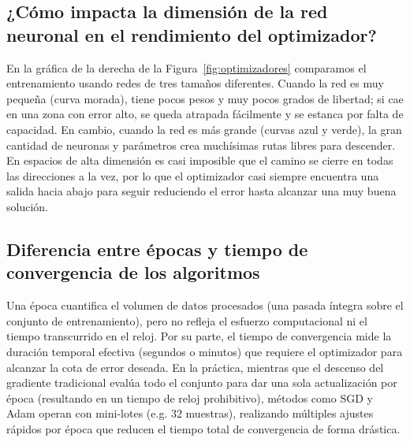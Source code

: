 \documentclass[10pt,a4paper]{article}
\begin{document}
\subsection*{¿Cómo impacta la dimensión de la red neuronal en el rendimiento del optimizador?}

En la gráfica de la derecha de la Figura~\ref{fig:optimizadores} comparamos el entrenamiento usando redes de tres tamaños diferentes. Cuando la red es muy pequeña (curva morada), tiene pocos pesos y muy pocos grados de libertad; si cae en una zona con error alto, se queda atrapada fácilmente y se estanca por falta de capacidad. En cambio, cuando la red es más grande (curvas azul y verde), la gran cantidad de neuronas y parámetros crea muchísimas rutas libres para descender. En espacios de alta dimensión es casi imposible que el camino se cierre en todas las direcciones a la vez, por lo que el optimizador casi siempre encuentra una salida hacia abajo para seguir reduciendo el error hasta alcanzar una muy buena solución.

\subsection*{Diferencia entre épocas y tiempo de convergencia de los algoritmos}

Una época cuantifica el volumen de datos procesados (una pasada íntegra sobre el conjunto de entrenamiento), pero no refleja el esfuerzo computacional ni el tiempo transcurrido en el reloj. Por su parte, el tiempo de convergencia mide la duración temporal efectiva (segundos o minutos) que requiere el optimizador para alcanzar la cota de error deseada. En la práctica, mientras que el descenso del gradiente tradicional evalúa todo el conjunto para dar una sola actualización por época (resultando en un tiempo de reloj prohibitivo), métodos como SGD y Adam operan con mini-lotes (e.g. 32 muestras), realizando múltiples ajustes rápidos por época que reducen el tiempo total de convergencia de forma drástica.
\end{document}
